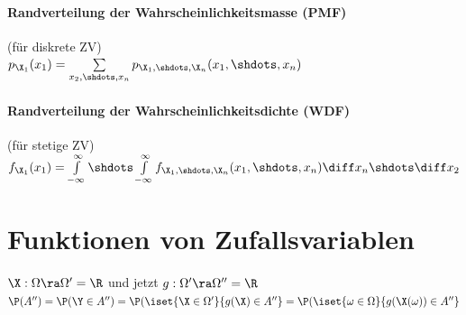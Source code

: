 \documentclass[german,color,6pt]{latex4ei/latex4ei_sheet}
\begin{document}
\begin{sectionbox}
	\paragraph{Randverteilung der Wahrscheinlichkeitsmasse (PMF)}
	(für diskrete ZV) \\
	$p_{\X_1}(x_1) = \sum\limits_{x_2,\shdots,x_n}{p_{\X_1,\shdots,\X_n}(x_1,\shdots,x_n)}$

	\paragraph{Randverteilung der Wahrscheinlichkeitsdichte (WDF)} (für stetige ZV) \\
	$f_{\X_1}(x_1) = \int\limits_{-\infty}^{\infty}{\shdots\int\limits_{-\infty}^{\infty}{f_{\X_1,\shdots,\X_n}(x_1,\shdots,x_n)\diff x_n\shdots}\diff x_2}$
\end{sectionbox}



\section{Funktionen von Zufallsvariablen}
\begin{sectionbox}
	$\X: \Omega \ra \Omega' = \R$ und jetzt $g:\Omega' \ra \Omega'' = \R$\\
	$\P(A'') = \P(\Y \in A'') = \P(\iset{\X \in \Omega'}{g(\X) \in A''} = \P(\iset{\omega \in \Omega}{g(\X(\omega)) \in A''}$
\end{sectionbox}
\end{document}
